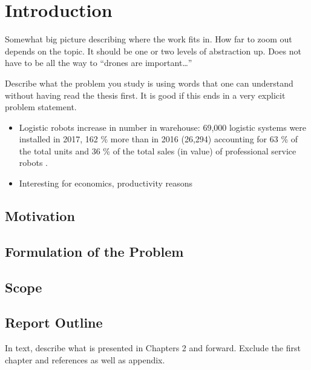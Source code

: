 \documentclass[/home/francois/latex/report/main.tex]{subfiles}
\begin{document}
\chapter{Introduction}


Somewhat big picture describing where the work fits in. How far to zoom out depends on the topic. It should be one or two levels of abstraction up. Does not have to be all the way to “drones are important…”

Describe what the problem you study is using words that one can understand without having read the thesis first. It is good if this ends in a very explicit problem statement.

\begin{itemize}
	\item Logistic robots increase in number in warehouse: 69,000 logistic systems were installed in 2017, 162 \% more than in 2016 (26,294) accounting for 63 \% of the total units and 36 \% of the total sales (in value) of professional service robots \cite{industrialRobot2018}.
	\item Interesting for economics, productivity reasons
\end{itemize}

\section{Motivation}

\section{Formulation of the Problem}

\section{Scope}

\section{Report Outline}
In text, describe what is presented in Chapters 2 and forward. Exclude the first chapter and references as well as appendix.
\end{document}
